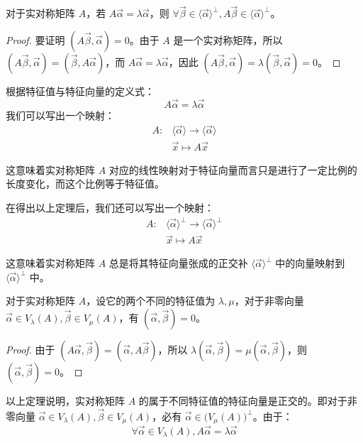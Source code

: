 \begin{theorem}
	对于实对称矩阵 $A$，若 $A \vec \alpha = \lambda \vec \alpha$，则 $\forall \vec \beta \in \langle \vec \alpha \rangle^\perp, A \vec \beta \in \langle \vec \alpha \rangle^\perp$。
\end{theorem}

\begin{proof}
	要证明 $(A \vec \beta, \vec \alpha) = 0$。由于 $A$ 是一个实对称矩阵，所以 $(A \vec \beta, \vec \alpha) = (\vec \beta, A \vec \alpha)$，而 $A \vec \alpha = \lambda \vec \alpha$，因此 $(A \vec \beta, \vec \alpha) = \lambda(\vec \beta, \vec \alpha) = 0$。
\end{proof}

根据特征值与特征向量的定义式：
$$
A \vec \alpha = \lambda \vec \alpha
$$
我们可以写出一个映射：
$$
\begin{aligned}
	A \colon & \langle \vec \alpha \rangle \rightarrow \langle \vec \alpha \rangle
	\\&
	\vec x \mapsto A \vec x
\end{aligned}
$$

这意味着实对称矩阵 $A$ 对应的线性映射对于特征向量而言只是进行了一定比例的长度变化，而这个比例等于特征值。

在得出以上定理后，我们还可以写出一个映射：
$$
\begin{aligned}
	A \colon & \langle \vec \alpha \rangle^\perp \rightarrow \langle \vec \alpha \rangle^\perp
	\\&
	\vec x \mapsto A \vec x
\end{aligned}
$$

这意味着实对称矩阵 $A$ 总是将其特征向量张成的正交补 $\langle \vec \alpha \rangle^\perp$ 中的向量映射到 $\langle \vec \alpha \rangle^\perp$ 中。

\begin{theorem}
	对于实对称矩阵 $A$，设它的两个不同的特征值为 $\lambda, \mu$，对于非零向量 $\vec \alpha \in V_\lambda(A), \vec \beta \in V_\mu(A)$，有 $(\vec \alpha, \vec \beta) = 0$。
\end{theorem}

\begin{proof}
	由于 $(A \vec \alpha, \vec \beta) = (\vec \alpha, A \vec \beta)$，所以 $\lambda(\vec \alpha, \vec \beta) = \mu (\vec \alpha, \vec \beta)$，则 $(\vec \alpha, \vec \beta) = 0$。
\end{proof}

以上定理说明，实对称矩阵 $A$ 的属于不同特征值的特征向量是正交的。即对于非零向量 $\vec \alpha \in V_\lambda(A), \vec \beta \in V_\mu(A)$，必有 $\vec \alpha \in \bigl( V_\mu(A) \bigr)^\perp$。由于：
$$
\forall \vec \alpha \in V_\lambda(A), A \vec \alpha = \lambda \vec \alpha
$$

